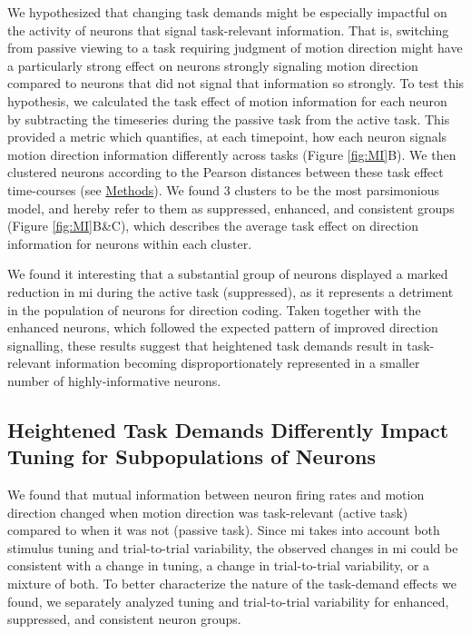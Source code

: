We hypothesized that changing task demands might be especially impactful on the activity of neurons that signal task-relevant information.
That is, switching from passive viewing to a task requiring judgment of motion direction might have a particularly strong effect on neurons strongly signaling motion direction compared to neurons that did not signal that information so strongly.
To test this hypothesis, we calculated the task effect of motion information for each neuron by subtracting the timeseries during the passive task from the active task. This provided a metric which quantifies, at each timepoint, how each neuron signals motion direction information differently across tasks (Figure \ref{fig:MI}B). We then clustered neurons according to the Pearson distances between these task effect time-courses (see \hyperref[{sec:methods}]{Methods}). We found 3 clusters to be the most parsimonious model, and hereby refer to them as suppressed, enhanced, and consistent groups (Figure \ref{fig:MI}B\&C), which describes the average task effect on direction information for neurons within each cluster.


We found it interesting that a substantial group of neurons displayed a marked reduction in \gls{mi} during the active task (suppressed), as it represents a detriment in the population of neurons for direction coding. Taken together with the enhanced neurons, which followed the expected pattern of improved direction signalling, these results suggest that heightened task demands result in task-relevant information becoming disproportionately represented in a smaller number of highly-informative neurons.

\subsection*{Heightened Task Demands Differently Impact Tuning for Subpopulations of Neurons}
We found that mutual information between neuron firing rates and motion direction changed when motion direction was task-relevant (active task) compared to when it was not (passive task). Since \gls{mi} takes into account both stimulus tuning and trial-to-trial variability, the observed changes in \gls{mi} could be consistent with a change in tuning, a change in trial-to-trial variability, or a mixture of both. To better characterize the nature of the task-demand effects we found, we separately analyzed tuning and trial-to-trial variability for enhanced, suppressed, and consistent neuron groups.

